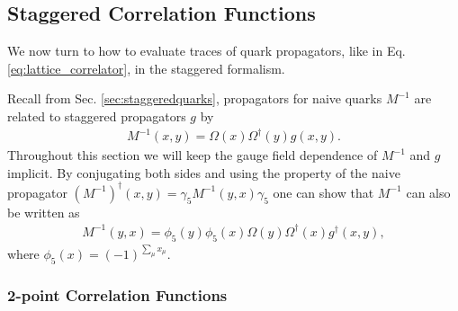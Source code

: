 \subsection{Staggered Correlation Functions}
\label{sec:staggeredcorrelators}

We now turn to how to evaluate traces of quark propagators, like in Eq. \eqref{eq:lattice_correlator}, in the staggered formalism. %

Recall from Sec. \ref{sec:staggeredquarks}, propagators for naive quarks $M^{-1}$ are related to staggered propagators $g$ by
\begin{align}
  M^{-1}(x,y) = \Omega(x)\Omega^{\dagger}(y) g(x,y).
\end{align}
Throughout this section we will keep the gauge field dependence of $M^{-1}$ and $g$ implicit. By conjugating both sides and using the property of the naive propagator $(M^{-1})^{\dagger}(x,y) = \gamma_5 M^{-1}(y,x)\gamma_5$ one can show that $M^{-1}$ can also be written as
\begin{align}
  \label{eq:Gconj}
  M^{-1}(y,x) = \phi_5(y)\phi_5(x) \Omega(y)\Omega^{\dagger}(x) g^{\dagger}(x,y),
\end{align}
where $\phi_5(x) = (-1)^{\sum_{\mu} x_{\mu}}$.

\subsubsection{2-point Correlation Functions}

